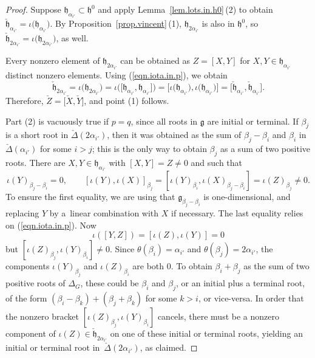 \documentclass[pdftex]{sigma}
\numberwithin{equation}{section}
\theoremstyle{definition}
\newcommand{\lieg}{\mathfrak{g}}
\newcommand{\lieh}{\mathfrak{h}}
\begin{document}
\begin{proof}
Suppose $\lieh_{ \alpha_{i'}} \subset \lieh^0$ and apply Lemma~\ref{lem.lots.in.h0}\,(2) to obtain $\check{\lieh}_{ \alpha_{i'}} = \iota\bigl(\lieh_{ \alpha_{i'}}\bigr)$. By Proposition~\ref{prop.vincent}\,(1), $\lieh_{2 \alpha_{i'}}$ is also in $\lieh^0$, so $\check{\lieh}_{2 \alpha_{i'}} = \iota\bigl(\lieh_{2 \alpha_{i'}}\bigr)$, as well.

Every nonzero element of $\lieh_{2 \alpha_{i'}}$ can be obtained as $Z = [X,Y]$ for $X,Y \in \lieh_{\alpha_{i'}}$ distinct nonzero elements. Using (\ref{eqn.iota.in.p}), we obtain
\[\check{\lieh}_{2 \alpha_{i'}} = \iota\bigl(\lieh_{2\alpha_{i'}}\bigr) = \iota \bigl( \bigl[ \lieh_{\alpha_{i'}}, \lieh_{\alpha_{i'}}\bigr] \bigr) = \bigl[ \iota\bigl(\lieh_{ \alpha_{i'}}\bigr), \iota\bigl(\lieh_{ \alpha_{i'}}\bigr)\bigr] = \bigl[ \check{\lieh}_{\alpha_{i'}}, \check{\lieh}_{\alpha_{i'}}\bigr].\]
Therefore, $\check{Z} = \bigl[\check{X},\check{Y}\bigr]$, and
point (1) follows.

Part (2) is vacuously true if $p=q$, since all roots in $\lieg$ are initial or terminal.
If $\beta_j$ is a short root in $\check{\Delta}(2 \alpha_{i'})$, then it was obtained as the sum of $\beta_j - \beta_i$ and $\beta_i$ in $\check{\Delta}(\alpha_{i'})$ for some $i > j$; this is the only way to obtain $\beta_j$ as a sum of two positive roots. There are $X,Y \in \lieh_{\alpha_{i'}}$ with $[X,Y]=Z \neq 0$ and
such that
\[
\iota(Y)_{\beta_j - \beta_i} = 0, \qquad
[\iota(Y),\iota(X)]_{\beta_j} = [\iota(Y)_{\beta_i}, \iota(X)_{\beta_j - \beta_i}] = \iota(Z)_{\beta_j} \neq 0.\]
To ensure the first equality, we are using that $\lieg_{\beta_j-\beta_i}$ is one-dimensional, and replacing $Y$ by a~linear combination with $X$ if necessary. The last equality relies on (\ref{eqn.iota.in.p}).
Now
\[
\iota([Y,Z]) = [\iota(Z),\iota(Y)] = 0
\] but $[ \iota(Z)_{\beta_j},\iota(Y)_{\beta_i}] \neq 0$. Since $\theta(\beta_i) = \alpha_{i'}$ and $\theta(\beta_j) = 2 \alpha_{i'}$, the components
$\iota(Y)_{\beta_j}$ and $\iota(Z)_{\beta_i}$ are both $0$. To obtain $\beta_i + \beta_j$ as the sum of two positive roots of $\Delta_G$, these could be $\beta_i$ and $\beta_j$, or an initial plus a terminal root, of the form $(\beta_i - \beta_k) + (\beta_j + \beta_k)$ for some $k > i$, or vice-versa. In order that the nonzero bracket $[ \iota(Z)_{\beta_j},\iota(Y)_{\beta_i}]$ cancels, there must be a nonzero component of $\iota(Z) \in \check{\lieh}_{2 \alpha_{i'}}$ on one of these initial or terminal roots, yielding an initial or terminal root in~$\check{\Delta}(2 \alpha_{i'})$, as claimed.
\end{proof}
\end{document}
